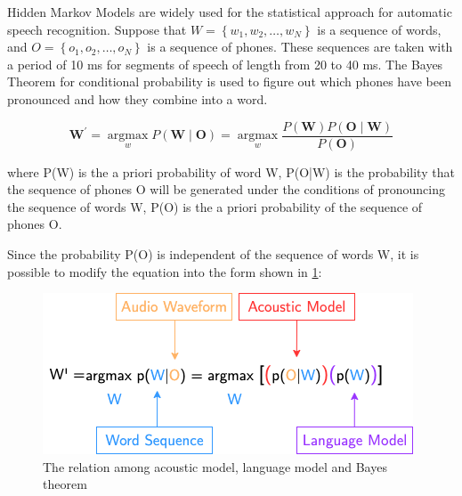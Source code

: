 Hidden Markov Models are widely used for the statistical approach for automatic speech recognition. Suppose that $W=\left\{w_{1}, w_{2}, \ldots, w_{N}\right\}$ is a sequence of words, and $O=\left\{o_{1}, o_{2}, \ldots, o_{N}\right\}$ is a sequence of phones. These sequences are taken with a period of 10 ms for segments of speech of length from 20 to 40 ms. The Bayes Theorem for conditional probability is used to figure out which phones have been pronounced and how they combine into a word.

\begin{equation}
    \boldsymbol{W}^{\prime}=\underset{w}{\operatorname{argmax}} P(\boldsymbol{W} \mid \boldsymbol{O})=\underset{w}{\operatorname{argmax}} \frac{P(\boldsymbol{W}) P(\boldsymbol{O} \mid \boldsymbol{W})}{P(\boldsymbol{O})}
\end{equation}




where P(W) is the a priori probability of word W, P(O|W) is the probability that the sequence of phones O will be generated under the conditions of pronouncing the sequence of words W, P(O) is the a priori probability of the sequence of phones O. 

Since the probability P(O) is independent of the sequence of words W, it is possible to modify the equation into the form shown in \cref{fig:bayes}:


\begin{figure}[H]
	\centering
	\includegraphics[width=\textwidth]{img/asr_bayes.png}
	\caption{The relation among acoustic model, language model and Bayes theorem}
	\label{fig:bayes}
\end{figure}

